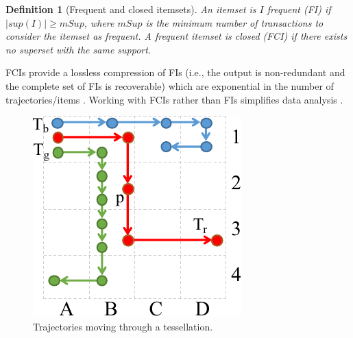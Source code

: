 \documentclass[
]{ceurart}
\newtheorem{example}{Example}
\newtheorem{definition}{Definition}
\begin{document}

\begin{definition}[Frequent and closed itemsets]\label{def:fci}
An itemset is $I$ \textit{frequent} (FI) if $|sup(I)|\geq mSup$, where $mSup$ is the minimum number of transactions to consider the itemset as frequent.
A frequent itemset is \textit{closed} (FCI) if there exists no superset with the same support. 
\end{definition}

FCIs provide a lossless compression of FIs \citep{DBLP:conf/dmkd/PeiHM00} (i.e., the output is non-redundant and the complete set of FIs is recoverable) which are exponential in the number of trajectories/items \citep{DBLP:conf/vldb/AgrawalS94}. 
Working with FCIs rather than FIs simplifies data analysis \citep{DBLP:journals/isci/FranciaGR20}.


%
\begin{figure}[t]
    \centering
    \includegraphics[scale=.6]{patterns2.pdf}
    \caption{Trajectories moving through a tessellation.}
    \label{fig:patterns2}
\end{figure}
\end{document}
